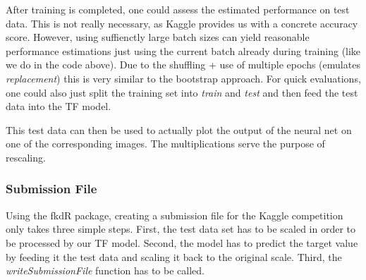 \documentclass[]{article}
\newenvironment{Shaded}{\begin{snugshade}}{\end{snugshade}}
\newcommand{\KeywordTok}[1]{\textcolor[rgb]{0.13,0.29,0.53}{\textbf{{#1}}}}
\newcommand{\DataTypeTok}[1]{\textcolor[rgb]{0.13,0.29,0.53}{{#1}}}
\newcommand{\DecValTok}[1]{\textcolor[rgb]{0.00,0.00,0.81}{{#1}}}
\newcommand{\StringTok}[1]{\textcolor[rgb]{0.31,0.60,0.02}{{#1}}}
\newcommand{\NormalTok}[1]{{#1}}
\begin{document}
After training is completed, one could assess the estimated performance
on test data. This is not really necessary, as Kaggle provides us with a
concrete accuracy score. However, using suffienctly large batch sizes
can yield reasonable performance estimations just using the current
batch already during training (like we do in the code above). Due to the
shuffling + use of multiple epochs (emulates \emph{replacement}) this is
very similar to the bootstrap approach. For quick evaluations, one could
also just split the training set into \emph{train} and \emph{test} and
then feed the test data into the TF model.

\begin{Shaded}
\end{Shaded}

This test data can then be used to actually plot the output of the
neural net on one of the corresponding images. The multiplications serve
the purpose of rescaling.

\begin{Shaded}
\end{Shaded}

\subsubsection{Submission File}\label{submission-file}

Using the fkdR package, creating a submission file for the Kaggle
competition only takes three simple steps. First, the test data set has
to be scaled in order to be processed by our TF model. Second, the model
has to predict the target value by feeding it the test data and scaling
it back to the original scale. Third, the \emph{writeSubmissionFile}
function has to be called.
\end{document}
